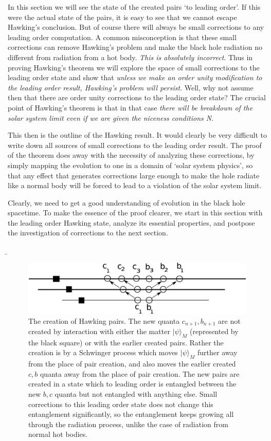 \documentclass[12pt]{article}
\begin{document}
In this section we will see the state of the created pairs `to leading order'. If this were the actual state of the pairs, it is easy to see that we cannot escape Hawking's conclusion. But of course there will always be small corrections to any leading order computation. A common misconception is that these small corrections can remove Hawking's problem and make the black hole radiation no different from radiation from a hot body. {\it This is absolutely incorrect}. Thus  in proving  Hawking's theorem we will explore the space of small corrections to the leading order state and show that {\it unless we make an order unity modification to the leading order result, Hawking's problem will persist}. Well, why not assume then that there are order unity corrections to the leading order state? The crucial point of Hawking's theorem is that in that case {\it there will be breakdown of the solar system limit even if we are given the niceness conditions N}. 

This then is the outline of the Hawking result. It would clearly be very difficult to write down all sources of small corrections to the leading order result. The proof of the theorem does away with the necessity of analyzing these corrections, by simply  mapping the  evolution to one in a domain of `solar system physics', so that any effect that generates corrections large enough to make the hole radiate like a normal body will be forced to lead to a violation of the solar system limit. 

Clearly, we need to get a good understanding of evolution in the black hole spacetime. To make the essence of the proof clearer, we start in this section with the leading order Hawking state, analyze its essential properties, and postpose the investigation of corrections to the next section. 



\b
\begin{figure}[tbp]
\begin{center}
\includegraphics[scale=.25]{ffour.eps}
\caption{{The creation of Hawking pairs. The new quanta $c_{n+1}, b_{n+1}$ are not created by interaction with either the matter $|\psi\rangle_M$ (represented by the black square) or with the earlier created pairs. Rather the creation is by a Schwinger process which moves $|\psi\rangle_M$ further away from the place of pair creation, and also moves the earlier created $c, b$ quanta away from the place of pair creation. The new pairs are created in a state which to leading order is entangled between the new $b,c$ quanta but not entangled with anything else. Small corrections to this leading order state does not change this entanglement significantly, so the entanglement keeps growing all through the radiation process, unlike the case of radiation from normal hot bodies.}}
\label{ffour}
\end{center}
\end{figure}
\end{document}
